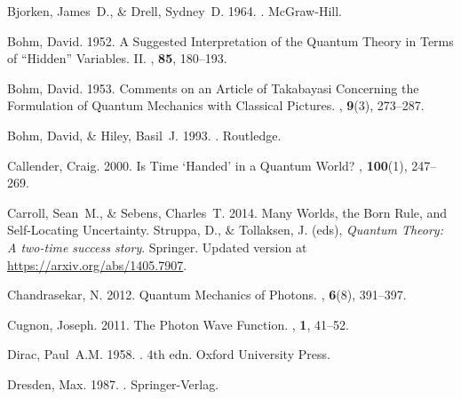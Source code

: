 \documentclass[12pt,secnumarabic,amsmath,amssymb,balancelastpage,nofootinbib]{article}
\begin{document}
\begin{thebibliography}{}
Bjorken, James~D., \& Drell, Sydney~D. 1964.
.
\newblock McGraw-Hill.

Bohm, David. 1952.
\newblock A Suggested Interpretation of the Quantum Theory in Terms of
  ``Hidden'' Variables. II.
, {\bf 85}, 180--193.

Bohm, David. 1953.
\newblock Comments on an Article of Takabayasi Concerning the Formulation of
  Quantum Mechanics with Classical Pictures.
, {\bf 9}(3), 273--287.

Bohm, David, \& Hiley, Basil~J. 1993.
.
\newblock Routledge.

Callender, Craig. 2000.
\newblock Is Time `Handed' in a Quantum World?
, {\bf 100}(1),
  247--269.

Carroll, Sean~M., \& Sebens, Charles~T. 2014.
\newblock Many Worlds, the Born Rule, and Self-Locating Uncertainty.
 Struppa, D., \& Tollaksen, J. (eds), {\em
  Quantum Theory: A two-time success story}.
\newblock Springer.
\newblock Updated version at
  \href{https://arxiv.org/abs/1405.7907}{https://arxiv.org/abs/1405.7907}.

Chandrasekar, N. 2012.
\newblock Quantum Mechanics of Photons.
, {\bf 6}(8), 391--397.

Cugnon, Joseph. 2011.
\newblock The Photon Wave Function.
, {\bf 1}, 41--52.

Dirac, Paul~A.M. 1958.
. 4th edn.
\newblock Oxford University Press.

Dresden, Max. 1987.
.
\newblock Springer-Verlag.


\end{thebibliography}
\end{document}
